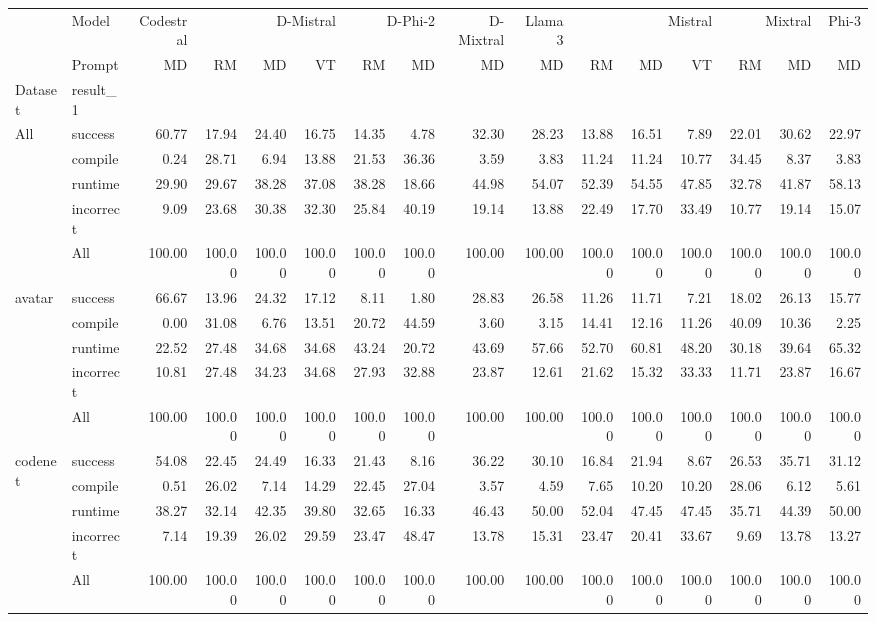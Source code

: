 \begin{tabular}{llrrrrrrrrrrrrrr}
\toprule
 & Model & Codestral & \multicolumn{3}{r}{D-Mistral} & \multicolumn{2}{r}{D-Phi-2} & D-Mixtral & Llama 3 & \multicolumn{3}{r}{Mistral} & \multicolumn{2}{r}{Mixtral} & Phi-3 \\
 & Prompt & MD & RM & MD & VT & RM & MD & MD & MD & RM & MD & VT & RM & MD & MD \\
Dataset & result_1 &  &  &  &  &  &  &  &  &  &  &  &  &  &  \\
\midrule
\multirow[t]{5}{*}{All} & success & 60.77 & 17.94 & 24.40 & 16.75 & 14.35 & 4.78 & 32.30 & 28.23 & 13.88 & 16.51 & 7.89 & 22.01 & 30.62 & 22.97 \\
 & compile & 0.24 & 28.71 & 6.94 & 13.88 & 21.53 & 36.36 & 3.59 & 3.83 & 11.24 & 11.24 & 10.77 & 34.45 & 8.37 & 3.83 \\
 & runtime & 29.90 & 29.67 & 38.28 & 37.08 & 38.28 & 18.66 & 44.98 & 54.07 & 52.39 & 54.55 & 47.85 & 32.78 & 41.87 & 58.13 \\
 & incorrect & 9.09 & 23.68 & 30.38 & 32.30 & 25.84 & 40.19 & 19.14 & 13.88 & 22.49 & 17.70 & 33.49 & 10.77 & 19.14 & 15.07 \\
 & All & 100.00 & 100.00 & 100.00 & 100.00 & 100.00 & 100.00 & 100.00 & 100.00 & 100.00 & 100.00 & 100.00 & 100.00 & 100.00 & 100.00 \\
\cline{1-16}
\multirow[t]{5}{*}{avatar} & success & 66.67 & 13.96 & 24.32 & 17.12 & 8.11 & 1.80 & 28.83 & 26.58 & 11.26 & 11.71 & 7.21 & 18.02 & 26.13 & 15.77 \\
 & compile & 0.00 & 31.08 & 6.76 & 13.51 & 20.72 & 44.59 & 3.60 & 3.15 & 14.41 & 12.16 & 11.26 & 40.09 & 10.36 & 2.25 \\
 & runtime & 22.52 & 27.48 & 34.68 & 34.68 & 43.24 & 20.72 & 43.69 & 57.66 & 52.70 & 60.81 & 48.20 & 30.18 & 39.64 & 65.32 \\
 & incorrect & 10.81 & 27.48 & 34.23 & 34.68 & 27.93 & 32.88 & 23.87 & 12.61 & 21.62 & 15.32 & 33.33 & 11.71 & 23.87 & 16.67 \\
 & All & 100.00 & 100.00 & 100.00 & 100.00 & 100.00 & 100.00 & 100.00 & 100.00 & 100.00 & 100.00 & 100.00 & 100.00 & 100.00 & 100.00 \\
\cline{1-16}
\multirow[t]{5}{*}{codenet} & success & 54.08 & 22.45 & 24.49 & 16.33 & 21.43 & 8.16 & 36.22 & 30.10 & 16.84 & 21.94 & 8.67 & 26.53 & 35.71 & 31.12 \\
 & compile & 0.51 & 26.02 & 7.14 & 14.29 & 22.45 & 27.04 & 3.57 & 4.59 & 7.65 & 10.20 & 10.20 & 28.06 & 6.12 & 5.61 \\
 & runtime & 38.27 & 32.14 & 42.35 & 39.80 & 32.65 & 16.33 & 46.43 & 50.00 & 52.04 & 47.45 & 47.45 & 35.71 & 44.39 & 50.00 \\
 & incorrect & 7.14 & 19.39 & 26.02 & 29.59 & 23.47 & 48.47 & 13.78 & 15.31 & 23.47 & 20.41 & 33.67 & 9.69 & 13.78 & 13.27 \\
 & All & 100.00 & 100.00 & 100.00 & 100.00 & 100.00 & 100.00 & 100.00 & 100.00 & 100.00 & 100.00 & 100.00 & 100.00 & 100.00 & 100.00 \\
\cline{1-16}
\bottomrule
\end{tabular}
